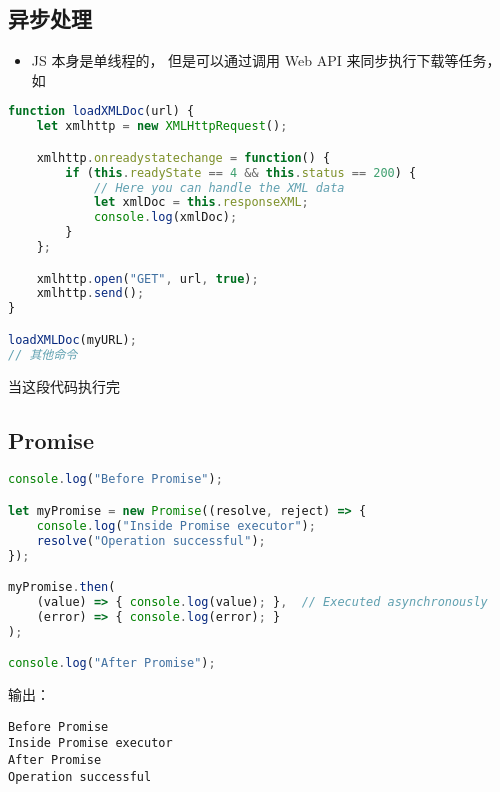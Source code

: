 

\begin{issues}
\issueDraft
\end{issues}


\subsection{异步处理}
\begin{itemize}
\item JS 本身是单线程的， 但是可以通过调用 Web API 来同步执行下载等任务， 如
\end{itemize}
\begin{lstlisting}[language=js]
function loadXMLDoc(url) {
    let xmlhttp = new XMLHttpRequest();

    xmlhttp.onreadystatechange = function() {
        if (this.readyState == 4 && this.status == 200) {
            // Here you can handle the XML data
            let xmlDoc = this.responseXML;
            console.log(xmlDoc);
        }
    };

    xmlhttp.open("GET", url, true);
    xmlhttp.send();
}

loadXMLDoc(myURL);
// 其他命令
\end{lstlisting}
当这段代码执行完

\subsection{Promise}
\begin{lstlisting}[language=js]
console.log("Before Promise");

let myPromise = new Promise((resolve, reject) => {
    console.log("Inside Promise executor");
    resolve("Operation successful");
});

myPromise.then(
    (value) => { console.log(value); },  // Executed asynchronously
    (error) => { console.log(error); }
);

console.log("After Promise");
\end{lstlisting}
输出：
\begin{lstlisting}[language=none]
Before Promise
Inside Promise executor
After Promise
Operation successful
\end{lstlisting}

